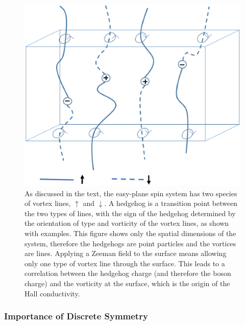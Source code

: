 \documentclass[prb,twocolumn]{revtex4-1}
\begin{document}
\begin{figure}
\includegraphics[width=\linewidth]{figures/monopoles.eps}
\caption{As discussed in the text, the easy-plane spin system has two species of vortex lines, $\uparrow$ and $\downarrow$. A hedgehog is a transition point between the two types of lines, with the sign of the hedgehog determined by the orientation of type and vorticity of the vortex lines, as shown with examples. This figure shows only the spatial dimensions of the system, therefore the hedgehogs are point particles and the vortices are lines. Applying a Zeeman field to the surface means allowing only one type of vortex line through the surface. This leads to a correlation between the hedgehog charge (and therefore the boson charge) and the vorticity at the surface, which is the origin of the Hall conductivity. }
\label{monopoles}
\end{figure}

\subsubsection{Importance of Discrete Symmetry}
\end{document}
